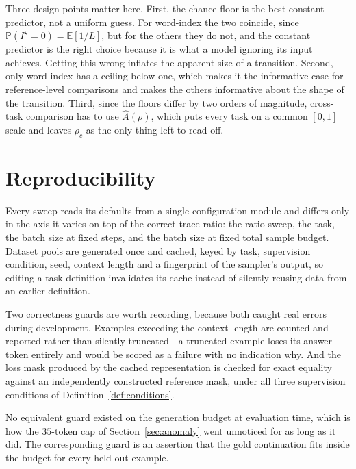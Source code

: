 \documentclass{article}
\theoremstyle{plain}
\theoremstyle{definition}
\theoremstyle{remark}
\newcommand{\E}{\mathbb{E}}
\newcommand{\Prob}{\mathbb{P}}
\newcommand{\1}{\mathbf{1}}
\begin{document}
Three design points matter here. First, the chance floor is the best constant
predictor, not a uniform guess. For word-index the two coincide, since
$\Prob(I^\star = 0) = \E[1/L]$, but for the others they do not, and the constant
predictor is the right choice because it is what a model ignoring its input
achieves. Getting this wrong inflates the apparent size of a transition. Second,
only word-index has a ceiling below one, which makes it the informative case for
reference-level comparisons and makes the others informative about the shape of
the transition. Third, since the floors differ by two orders of magnitude,
cross-task comparison has to use $\widehat A(\rho)$, which puts every task on a
common $[0,1]$ scale and leaves $\rho_c$ as the only thing left to read off.

\section{Reproducibility}
\label{app:repro}

Every sweep reads its defaults from a single configuration module and differs
only in the axis it varies on top of the correct-trace ratio: the ratio sweep,
the task, the batch size at fixed steps, and the batch size at fixed total sample
budget. Dataset pools are generated once and cached, keyed by task, supervision
condition, seed, context length and a fingerprint of the sampler's output, so
editing a task definition invalidates its cache instead of silently reusing data
from an earlier definition.

Two correctness guards are worth recording, because both caught real errors
during development. Examples exceeding the context length are counted and
reported rather than silently truncated---a truncated example loses its answer
token entirely and would be scored as a failure with no indication why. And the
loss mask produced by the cached representation is checked for exact equality
against an independently constructed reference mask, under all three supervision
conditions of Definition~\ref{def:conditions}.

No equivalent guard existed on the generation budget at evaluation time, which is
how the $35$-token cap of Section~\ref{sec:anomaly} went unnoticed for as long as
it did. The corresponding guard is an assertion that the gold continuation fits
inside the budget for every held-out example.
\end{document}
